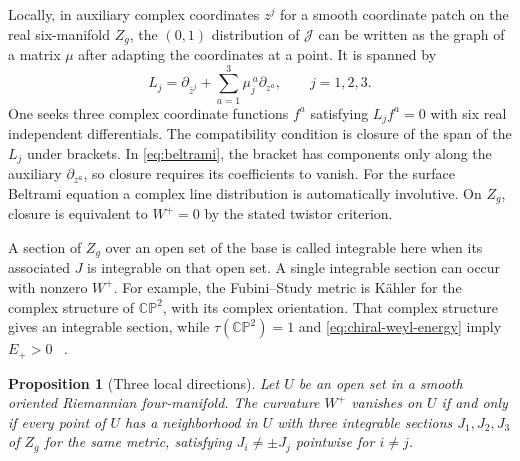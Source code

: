 \documentclass[11pt]{article}
\numberwithin{equation}{section}
\newtheorem{proposition}{Proposition}[section]
\newcommand{\CP}{\mathbb{CP}}
\begin{document}
Locally, in auxiliary complex coordinates \(z^j\) for a smooth
coordinate patch on the real six-manifold \(Z_g\), the \((0,1)\)
distribution of \(\mathcal J\) can be written as the graph of a
matrix \(\mu\) after adapting the coordinates at a point. It is
spanned by
\begin{equation}\label{eq:beltrami}
 L_j=\partial_{\bar z^j}+\sum_{a=1}^3\mu_j^{\,a}\partial_{z^a},
 \qquad j=1,2,3.
\end{equation}
One seeks three complex coordinate functions \(f^a\) satisfying
\(L_jf^a=0\) with six real independent differentials. The
compatibility condition is closure of the span of the \(L_j\) under
brackets. In \eqref{eq:beltrami}, the bracket has components only
along the auxiliary \(\partial_{z^a}\), so closure requires its
coefficients to vanish. For the surface Beltrami equation a complex
line distribution is automatically involutive. On \(Z_g\), closure
is equivalent to \(W^+=0\) by the stated twistor criterion.

A section of \(Z_g\) over an open set of the base is called
integrable here when its associated \(J\) is integrable on that open
set. A single integrable section can occur with nonzero \(W^+\).
For example, the Fubini--Study metric is K\"ahler for the complex
structure of \(\CP^2\), with its complex orientation. That complex
structure gives an integrable section, while
\(\tau(\CP^2)=1\) and \eqref{eq:chiral-weyl-energy} imply
\(E_+>0\)~\cite[eq.~(16)]{Hirzebruch1971Signature}
\cite[Theorem~B]{ChangGurskyYang2003}.

\begin{proposition}[Three local directions]
\label{prop:three-directions}
Let \(U\) be an open set in a smooth oriented Riemannian
four-manifold. The curvature \(W^+\) vanishes on \(U\) if and only
if every point of \(U\) has a neighborhood in \(U\) with three
integrable sections \(J_1,J_2,J_3\) of \(Z_g\) for the same metric,
satisfying \(J_i\ne\pm J_j\) pointwise for \(i\ne j\).
\end{proposition}
\end{document}
